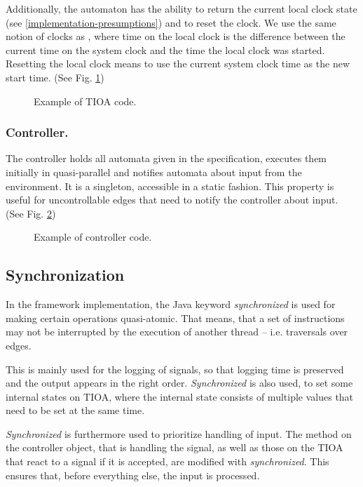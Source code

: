Additionally, the automaton has the ability to return the current
local clock state (see \ref{implementation-presumptions}) and to
reset the clock. We use the same notion of clocks as \cite{amnell_code_2002},
where time on the local clock is the difference between the current
time on the system clock and the time the local clock was started.
Resetting the local clock means to use the current system clock time
as the new start time. (See Fig. \ref{tioa-example})

\begin{figure}[t]

\caption{Example of TIOA code.}
\label{tioa-example}
\end{figure}


\subsubsection{Controller.}

The controller holds all automata given in the specification, executes
them initially in quasi-parallel and notifies automata about input
from the environment. It is a singleton, accessible in a static fashion.
This property is useful for uncontrollable edges that need to notify
the controller about input. (See Fig. \ref{controller-example})

\begin{figure}[t]

\caption{Example of controller code.}
\label{controller-example}
\end{figure}


\subsection{Synchronization}

In the framework implementation, the Java keyword \textit{synchronized} is 
used for making certain operations quasi-atomic. That means, that a set of
instructions may not be interrupted by the execution of another thread -- 
i.e. traversals over edges.

This is mainly used for the logging of signals, so that logging time
is preserved and the output appears in the right order. \textit{Synchronized}
is also used, to set some internal states on TIOA, where the internal state
consists of multiple values that need to be set at the same time.

\textit{Synchronized} is furthermore used to prioritize handling of input.  The
method on the controller object, that is handling the signal, as well as those
on the TIOA that react to a signal if it is accepted, are modified with
\textit{synchronized}. This ensures that, before everything else, the input is
processed.


